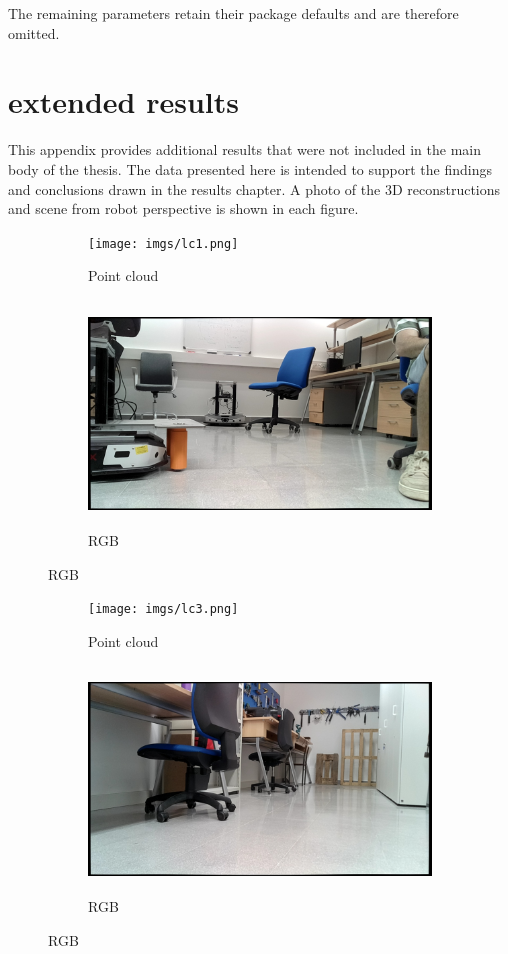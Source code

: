 The remaining parameters retain their package
defaults and are therefore omitted.

\chapter{extended results}\label{app:extended_results}

This appendix provides additional results that were not included in the main body of the thesis. The data presented here is intended to support the findings and conclusions drawn in the results chapter.
A photo of the 3D reconstructions and scene from robot perspective is shown in each figure.

\begin{figure}[H]
  \centering
  \begin{subfigure}[b]{0.47\textwidth}
    \centering
    \texttt{[image: imgs/lc1.png]}
    \caption{Point cloud}

  \end{subfigure}
  \hfill
  \begin{subfigure}[b]{0.47\textwidth}
    \centering
    \includegraphics[height=6cm,width=\textwidth]{imgs/lr1.png}
    \caption{RGB}

  \end{subfigure}
\end{figure}

\begin{figure}[H]
  \centering
  \begin{subfigure}[b]{0.47\textwidth}
    \centering
    \texttt{[image: imgs/lc3.png]}
    \caption{Point cloud}

  \end{subfigure}
  \hfill
  \begin{subfigure}[b]{0.47\textwidth}
    \centering
    \includegraphics[height=6cm,width=\textwidth]{imgs/lr3.png}
    \caption{RGB}

  \end{subfigure}
\end{figure}

